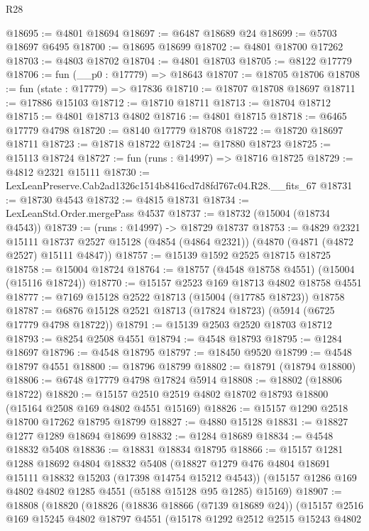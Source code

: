 \begin{lexlean}{R28}
\begin{coremodule}
@18695 := @4801 @18694
@18697 := @6487 @18689 @24
@18699 := @5703 @18697 @6495
@18700 := @18695 @18699
@18702 := @4801 @18700 @17262
@18703 := @4803 @18702
@18704 := @4801 @18703
@18705 := @8122 @17779
@18706 := fun (__p0 : @17779) => @18643
@18707 := @18705 @18706
@18708 := fun (state : @17779) => @17836
@18710 := @18707 @18708 @18697
@18711 := @17886 @15103
@18712 := @18710 @18711
@18713 := @18704 @18712
@18715 := @4801 @18713 @4802
@18716 := @4801 @18715
@18718 := @6465 @17779 @4798
@18720 := @8140 @17779 @18708
@18722 := @18720 @18697 @18711
@18723 := @18718 @18722
@18724 := @17880 @18723
@18725 := @15113 @18724
@18727 := fun (runs : @14997) => @18716 @18725
@18729 := @4812 @2321 @15111
@18730 := LexLeanPreserve.Cab2ad1326c1514b8416cd7d8fd767c04.R28.__fits_67
@18731 := @18730 @4543
@18732 := @4815 @18731
@18734 := LexLeanStd.Order.mergePass @4537
@18737 := @18732 (@15004 (@18734 @4543))
@18739 := (runs : @14997) -> @18729 @18737
@18753 := @4829
    @2321
    @15111
    @18737
    @2527
    @15128
    (@4854 (@4864 @2321))
    (@4870 (@4871 (@4872 @2527) @15111 @4847))
@18757 := @15139 @1592 @2525 @18715 @18725
@18758 := @15004 @18724
@18764 := @18757 (@4548 @18758 @4551) (@15004 (@15116 @18724))
@18770 := @15157 @2523 @169 @18713 @4802 @18758 @4551
@18777 := @7169 @15128 @2522 @18713 (@15004 (@17785 @18723)) @18758
@18787 := @6876 @15128 @2521 @18713 (@17824 @18723) (@5914 (@6725 @17779 @4798 @18722))
@18791 := @15139 @2503 @2520 @18703 @18712
@18793 := @8254 @2508 @4551
@18794 := @4548 @18793
@18795 := @1284 @18697
@18796 := @4548 @18795
@18797 := @18450 @9520
@18799 := @4548 @18797 @4551
@18800 := @18796 @18799
@18802 := @18791 (@18794 @18800)
@18806 := @6748 @17779 @4798 @17824 @5914
@18808 := @18802 (@18806 @18722)
@18820 := @15157 @2510 @2519 @4802 @18702 @18793 @18800 (@15164 @2508 @169 @4802 @4551 @15169)
@18826 := @15157 @1290 @2518 @18700 @17262 @18795 @18799
@18827 := @4880 @15128
@18831 := @18827 @1277 @1289 @18694 @18699
@18832 := @1284 @18689
@18834 := @4548 @18832 @5408
@18836 := @18831 @18834 @18795
@18866 := @15157
    @1281
    @1288
    @18692
    @4804
    @18832
    @5408
    (@18827 @1279 @476 @4804 @18691 @15111 @18832 @15203 (@17398 @14754 @15212 @4543))
    (@15157 @1286 @169 @4802 @4802 @1285 @4551 (@5188 @15128 @95 @1285) @15169)
@18907 := @18808
    (@18820
      (@18826
        (@18836 @18866 (@7139 @18689 @24))
        (@15157
          @2516
          @169
          @15245
          @4802
          @18797
          @4551
          (@15178
            @1292
            @2512
            @2515
            @15243
            @4802

\end{coremodule}
\end{lexlean}
